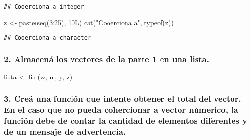 \documentclass[
]{article}
\newenvironment{Shaded}{\begin{snugshade}}{\end{snugshade}}
\newcommand{\DecValTok}[1]{\textcolor[rgb]{0.00,0.00,0.81}{#1}}
\newcommand{\FunctionTok}[1]{\textcolor[rgb]{0.00,0.00,0.00}{#1}}
\newcommand{\NormalTok}[1]{#1}
\newcommand{\OtherTok}[1]{\textcolor[rgb]{0.56,0.35,0.01}{#1}}
\newcommand{\SpecialCharTok}[1]{\textcolor[rgb]{0.00,0.00,0.00}{#1}}
\newcommand{\StringTok}[1]{\textcolor[rgb]{0.31,0.60,0.02}{#1}}
\begin{document}
\begin{verbatim}
## Cooerciona a integer
\end{verbatim}

\begin{Shaded}
\begin{Highlighting}[]
\NormalTok{z }\OtherTok{\textless{}{-}} \FunctionTok{paste}\NormalTok{(}\FunctionTok{seq}\NormalTok{(}\DecValTok{3}\SpecialCharTok{:}\DecValTok{25}\NormalTok{), 10L)}
\FunctionTok{cat}\NormalTok{(}\StringTok{"Cooerciona a"}\NormalTok{, }\FunctionTok{typeof}\NormalTok{(z))}
\end{Highlighting}
\end{Shaded}

\begin{verbatim}
## Cooerciona a character
\end{verbatim}

\hypertarget{almacenuxe1-los-vectores-de-la-parte-1-en-una-lista.}{%
\subsubsection{2. Almacená los vectores de la parte 1 en una
lista.}\label{almacenuxe1-los-vectores-de-la-parte-1-en-una-lista.}}

\begin{Shaded}
\begin{Highlighting}[]
\NormalTok{lista }\OtherTok{\textless{}{-}} \FunctionTok{list}\NormalTok{(w, m, y, z)}
\end{Highlighting}
\end{Shaded}

\hypertarget{creuxe1-una-funciuxf3n-que-intente-obtener-el-total-del-vector.-en-el-caso-que-no-pueda-cohercionar-a-vector-nuxfamerico-la-funciuxf3n-debe-de-contar-la-cantidad-de-elementos-diferentes-y-de-un-mensaje-de-advertencia.}{%
\subsubsection{3. Creá una función que intente obtener el total del
vector. En el caso que no pueda cohercionar a vector númerico, la
función debe de contar la cantidad de elementos diferentes y de un
mensaje de
advertencia.}\label{creuxe1-una-funciuxf3n-que-intente-obtener-el-total-del-vector.-en-el-caso-que-no-pueda-cohercionar-a-vector-nuxfamerico-la-funciuxf3n-debe-de-contar-la-cantidad-de-elementos-diferentes-y-de-un-mensaje-de-advertencia.}}
\end{document}
